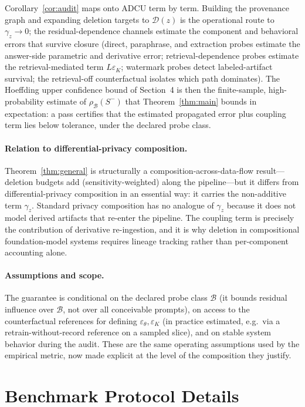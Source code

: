 \documentclass[10pt,journal,compsoc]{IEEEtran}
\newcommand{\method}{ADCU}
\begin{document}
Corollary~\ref{cor:audit} maps onto \method{} term by term. Building the
provenance graph and expanding deletion targets to $\mathcal{D}(z)$ is
the operational route to $\gamma_{z}\to 0$; the residual-dependence
channels estimate the component and behavioral errors that survive
closure (direct, paraphrase, and extraction probes estimate the
answer-side parametric and derivative error; retrieval-dependence probes
estimate the retrieval-mediated term $L\varepsilon_{K}$; watermark
probes detect labeled-artifact survival; the retrieval-off counterfactual
isolates which path dominates). The Hoeffding upper confidence bound of
Section~4 is then the finite-sample, high-probability estimate of
$\rho_{\mathcal{B}}(S^{-})$ that Theorem~\ref{thm:main} bounds in
expectation: a pass certifies that the estimated propagated error plus
coupling term lies below tolerance, under the declared probe class.

\paragraph{Relation to differential-privacy composition.}
Theorem~\ref{thm:general} is structurally a composition-across-data-flow
result---deletion budgets add (sensitivity-weighted) along the
pipeline---but it differs from differential-privacy composition in an
essential way: it carries the non-additive term $\gamma_{z}$. Standard
privacy composition has no analogue of $\gamma_{z}$ because it does not
model derived artifacts that re-enter the pipeline. The coupling term is
precisely the contribution of derivative re-ingestion, and it is why
deletion in compositional foundation-model systems requires lineage
tracking rather than per-component accounting alone.

\paragraph{Assumptions and scope.}
The guarantee is conditional on the declared probe class $\mathcal{B}$
(it bounds residual influence over $\mathcal{B}$, not over all
conceivable prompts), on access to the counterfactual references for
defining $\varepsilon_{\theta},\varepsilon_{K}$ (in practice estimated,
e.g.\ via a retrain-without-record reference on a sampled slice), and on
stable system behavior during the audit. These are the same operating
assumptions used by the empirical metric, now made explicit at the level
of the composition they justify.

\section{Benchmark Protocol Details}
\end{document}
